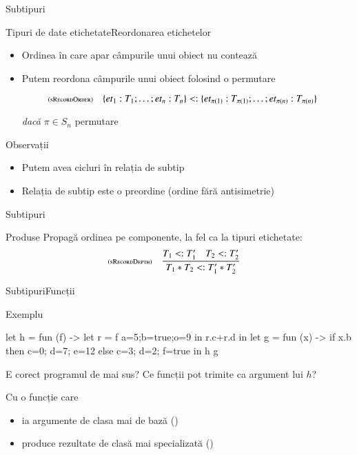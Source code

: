 \documentclass[xcolor=pdftex,romanian,colorlinks]{beamer}
\begin{document}
\begin{section}{Subtipuri}
\begin{frame}{Tipuri de date etichetate}{Reordonarea etichetelor}
\begin{itemize}
\item Ordinea în care apar câmpurile unui obiect nu contează
\item Putem reordona câmpurile unui obiect folosind o permutare
 {\small \[\reg[sRecordOrder]{\{{\it et}_1 : T_1;\ldots;{\it et}_{n}:T_{n}\} \stip \{{\it et}_{\pi(1)} : T_{\pi(1)};\ldots;{\it et}_{\pi(n)}:T_{\pi(n)}\}}{}{}\]

\hfill {\it dacă } $\pi\in S_n$ permutare}
\end{itemize}

\begin{block}{Observații}
\begin{itemize}
\item Putem avea cicluri în relația de subtip
\item Relația de subtip este o preordine (ordine fără antisimetrie)
\end{itemize}
\end{block}
\end{frame}

\begin{frame}{Subtipuri}%
\begin{block}{Produse}
Propagă ordinea pe componente, la fel ca la tipuri etichetate:
\[
\reg[sRecordDepth]{T_1 * T_{2} \stip T_1' * T_{2}'}{T_1\stip T_1'\si T_2\stip T_2'}{}
\]
\end{block}

\end{frame}

\begin{frame}[fragile]{Subtipuri}{Funcții}
\begin{block}{Exemplu}
\begin{asciiml}
let h = fun (f) ->
     let r = f {a=5;b=true;o=9} in r.c+r.d
in let g = fun (x) -> if x.b then {c=0; d=7; e=12} 
                                       else {c=3; d=2; f=true}
in h g 
\end{asciiml}
E corect programul de mai sus? Ce funcții pot trimite ca argument lui $h$? 

 Cu o funcție care 
\begin{itemize} 
\item ia argumente de clasa mai de bază ()
\item  produce rezultate de clasă mai specializată
()
\end{itemize}
\end{block}


\end{frame}
\end{section}
\end{document}
